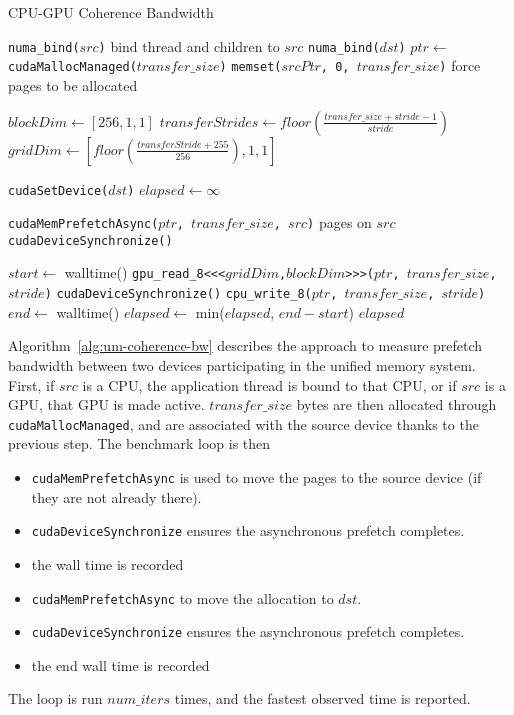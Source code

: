 \begin{algorithm}
	\caption{CPU-GPU Coherence Bandwidth}
	\label{alg:um-coherence-bw}
	\begin{algorithmic}[1]
		\Statex
				
		\State \texttt{numa\_bind($src$)} \Comment bind thread and children to $src$
		\EndIf
		\State \texttt{numa\_bind($dst$)}
		\EndIf
		\State $ptr \gets$ \texttt{cudaMallocManaged($transfer\_size$)}
		\State \texttt{memset($srcPtr$, 0, $transfer\_size$)} \Comment force pages to be allocated
				        
				
		\State $blockDim \gets [256,1,1]$
		\State $transferStrides \gets floor(\frac{transfer\_size + stride - 1}{stride})$
		\State $gridDim \gets [floor(\frac{transferStride + 255}{256}), 1, 1]$
				
		\State \texttt{cudaSetDevice($dst$)}
		\EndIf
		\State $elapsed \gets \infty$
				
		\State \texttt{cudaMemPrefetchAsync($ptr$, $transfer\_size$, $src$)} \Comment pages on $src$
		\State \texttt{cudaDeviceSynchronize()}
				
		\State $start \gets$ walltime()
		\State \texttt{gpu\_read\_8<<<$gridDim$,$blockDim$>>>($ptr$, $transfer\_size$, $stride$)}
		\State \texttt{cudaDeviceSynchronize()}
		\Else
		\State \texttt{cpu\_write\_8($ptr$, $transfer\_size$, $stride$)}
		\EndIf
		\State $end \gets$ walltime()
		\State $elapsed \gets$ min($elapsed$, $end-start$)
		\EndFor
		\State \Return $elapsed$
		\EndFunction
				
	\end{algorithmic}
\end{algorithm}

Algorithm~\ref{alg:um-coherence-bw} describes the approach to measure prefetch bandwidth between two devices participating in the unified memory system.
First, if $src$ is a CPU, the application thread is bound to that CPU, or if $src$ is a GPU, that GPU is made active.
$transfer\_size$ bytes are then allocated through \texttt{cudaMallocManaged}, and are associated with the source device thanks to the previous step.
The benchmark loop is then
\begin{itemize}
	\item \texttt{cudaMemPrefetchAsync} is used to move the pages to the source device (if they are not already there).
	\item \texttt{cudaDeviceSynchronize} ensures the asynchronous prefetch completes.
	\item the wall time is recorded
	\item \texttt{cudaMemPrefetchAsync} to move the allocation to $dst$.
	\item \texttt{cudaDeviceSynchronize} ensures the asynchronous prefetch completes.
	\item the end wall time is recorded
\end{itemize}
The loop is run $num\_iters$ times, and the fastest observed time is reported.

